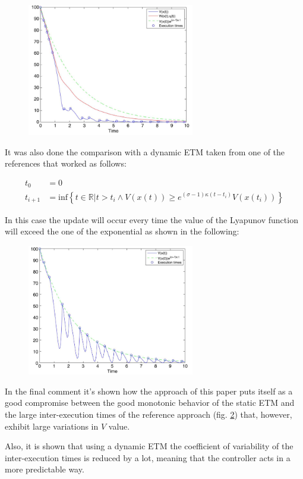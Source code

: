 \documentclass[12pt]{article}
\begin{document}
\begin{figure}[H]
    \centering
    \includegraphics[width=0.65\textwidth]{img/dynamic}
    \caption{}
    \label{dynamic-plot}
\end{figure}

It was also done the comparison with a dynamic ETM taken from one of the references that worked as follows:

\begin{align}
  t_0 &= 0 \nonumber \\
  t_{i+1} &= \text{inf} \left\{ t \in \mathbb{R} | t > t_i \wedge V(x(t)) \geq e^{\left( \sigma - 1 \right) \kappa \left( t - t_i \right)} V(x(t_i)) \right\}
\end{align}

In this case the update will occur every time the value of the Lyapunov function will exceed the one of the exponential as shown in the following:

\begin{figure}[H]
    \centering
    \includegraphics[width=0.65\textwidth]{img/reference}
    \caption{}
    \label{reference-plot}
\end{figure}

In the final comment it's shown how the approach of this paper puts itself as a good compromise between the good monotonic behavior of the static ETM and the large inter-execution times of the reference approach (fig. \ref{reference-plot}) that, however, exhibit large variations in $V$ value.

Also, it is shown that using a dynamic ETM the coefficient of variability of the inter-execution times is reduced by a lot, meaning that the controller acts in a more predictable way.
\end{document}

